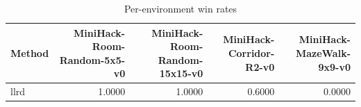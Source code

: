 \begin{table}[htbp]
\centering
\caption{Per-environment win rates}
\label{tab:per-env}
\begin{tabular}{lrrrr}
\toprule
\textbf{Method} & \textbf{MiniHack-Room-Random-5x5-v0} & \textbf{MiniHack-Room-Random-15x15-v0} & \textbf{MiniHack-Corridor-R2-v0} & \textbf{MiniHack-MazeWalk-9x9-v0} \\
\midrule
llrd & 1.0000 & 1.0000 & 0.6000 & 0.0000 \\
\bottomrule
\end{tabular}
\end{table}